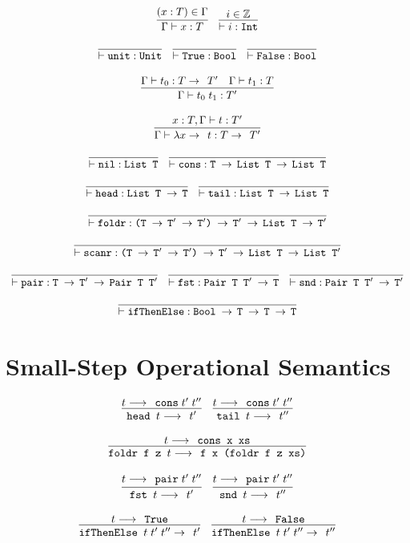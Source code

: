 \documentclass[10pt]{article}
\newcommand{\ttt}[1]{\texttt{#1}}
\newcommand{\ra}{\ensuremath{\rightarrow\;\,}}
\newcommand{\reduces}{\ensuremath{\longrightarrow\;\,}}
\begin{document}
\[
  \begin{array}{cc}
    \infer{\Gamma \vdash x : T}{(x : T) \in \Gamma}
    ~~~
    \infer{\vdash i : \ttt{Int}}{i \in \mathbb{Z}}
    \\\\
    \infer{\vdash \ttt{unit} : \ttt{Unit}}{}
    ~~~
    \infer{\vdash \ttt{True} : \ttt{Bool}}{}
    ~~~
    \infer{\vdash \ttt{False} : \ttt{Bool}}{}
    \\\\
    \infer{\Gamma \vdash t_0\; t_1 : T'}{\Gamma \vdash t_0 : T \ra T' & \Gamma \vdash t_1 : T}
    \\\\
    \infer{\Gamma \vdash \lambda x \ra t : T \ra T'}{x : T, \Gamma \vdash t : T'}
    \\\\
    \infer{\vdash \ttt{nil} : \ttt{List T}}{}
    ~~~
    \infer{\vdash \ttt{cons} : \ttt{T \ra List T \ra List T}}{}
    \\\\
    \infer{\vdash \ttt{head} : \ttt{List T \ra T}}{}
    ~~~
    \infer{\vdash \ttt{tail} : \ttt{List T \ra List T}}{}
    \\\\
    \infer{\vdash \ttt{foldr} : \ttt{(T \ra T$'$ \ra T$'$) \ra T$'$ \ra List T \ra T$'$}}{}
    \\\\
    \infer{\vdash \ttt{scanr} : \ttt{(T \ra T$'$ \ra T$'$) \ra T$'$ \ra List T \ra List T$'$}}{}
    \\\\
    \infer{\vdash \ttt{pair} : \ttt{T \ra T$'$ \ra Pair T T$'$}}{}
    ~~~
    \infer{\vdash \ttt{fst} : \ttt{Pair T T$'$ \ra T}}{}
    ~~~
    \infer{\vdash \ttt{snd} : \ttt{Pair T T$'$ \ra T$'$}}{}
    \\\\
    \infer{\vdash \ttt{ifThenElse} : \ttt{Bool \ra T \ra T \ra T}}{}
  \end{array}
\]

\section{Small-Step Operational Semantics}

\[
  \begin{array}{cc}
    \infer{\ttt{head } t \reduces t'}{t \reduces \ttt{cons}\; t'\; t''}
    ~~~
    \infer{\ttt{tail } t \reduces t''}{t \reduces \ttt{cons}\; t'\; t''}
    \\\\
    \infer{\ttt{foldr f z $t$} \reduces \ttt{f x (foldr f z xs)}}{t \reduces \ttt{cons x xs}}
    \\\\
    \infer{\ttt{fst } t \reduces t'}{t \reduces \ttt{pair}\; t'\; t''}
    ~~~
    \infer{\ttt{snd } t \reduces t''}{t \reduces \ttt{pair}\; t'\; t''}
    \\\\
    \infer{\ttt{ifThenElse } t\; t'\; t'' \ra t'}{t \reduces \ttt{True}}
    ~~~
    \infer{\ttt{ifThenElse } t\; t'\; t'' \ra t''}{t \reduces \ttt{False}}
    
  \end{array}
\]
\end{document}
